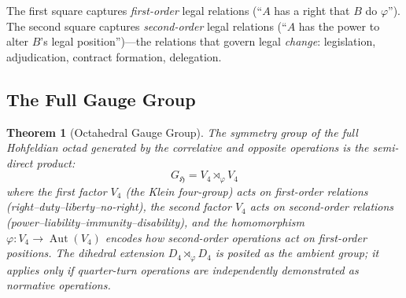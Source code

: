 \documentclass[12pt]{article}
\newtheorem{theorem}{Theorem}[section]
\theoremstyle{definition}
\theoremstyle{remark}
\newcommand{\Ho}{\mathfrak{H}}             %
\begin{document}
The first square captures \emph{first-order} legal relations (``$A$ has a right that $B$ do $\varphi$'').  The second square captures \emph{second-order} legal relations (``$A$ has the power to alter $B$'s legal position'')---the relations that govern legal \emph{change}: legislation, adjudication, contract formation, delegation.

\subsection{The Full Gauge Group}

\begin{theorem}[Octahedral Gauge Group]
\label{thm:gauge_group}
The symmetry group of the full Hohfeldian octad generated by the correlative and opposite operations is the \emph{semi-direct product}:
\begin{equation}
G_{\Ho} = V_4 \rtimes_\varphi V_4
\label{eq:semidirect}
\end{equation}
where the first factor $V_4$ (the Klein four-group) acts on first-order relations (right--duty--liberty--no-right), the second factor $V_4$ acts on second-order relations (power--liability--immunity--disability), and the homomorphism $\varphi: V_4 \to \operatorname{Aut}(V_4)$ encodes how second-order operations act on first-order positions.  The dihedral extension $D_4 \rtimes_\varphi D_4$ is posited as the ambient group; it applies only if quarter-turn operations are independently demonstrated as normative operations.
\end{theorem}
\end{document}
